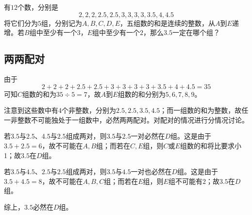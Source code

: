 

有$12$个数，分别是
\[ 2, 2, 2, 2.5, 2.5, 3, 3, 3, 3, 3.5, 4, 4.5 \]
将它们分为$5$组，分别记为$A, B, C, D, E$，五组数的和是连续的整数，从$A$到$E$递增。若$B$组中至少有一个$3$，$E$组中至少有一个$2$，那么$3.5$一定在哪个组？


\subsection{两两配对}

由于
\[ 2 + 2 + 2 + 2.5 + 2.5 + 3 + 3 + 3 + 3 + 3.5 + 4 + 4.5 = 35 \]
可知$C$组数的和为$35 \div 5 = 7$，故$A$到$E$组数的和分别为$5, 6, 7, 8, 9$。

注意到这些数中有4个非整数，分别为$2.5, 2.5, 3.5, 4.5$；而一组数的和为整数，故任一非整数不可能独处于一组数中，必然两两配对。对配对的情况进行分情况讨论。

若$3.5$与$2.5$、$4.5$与$2.5$组成两对，则$3.5$与$2.5$一对必然在$D$组。这是由于$3.5 + 2.5 = 6$，故不可能在$A, B$组；而若在$C, E$组，则$C$或$E$组数的和将比要求小1；故$3.5$在$D$组。

若$3.5$与$4.5$、$2.5$与$2.5$组成两对，则$3.5$与$4.5$一对也必然在$D$组。这是由于$3.5 + 4.5 = 8$，故不可能在$A, B, C$组；而若在$E$组，则$E$组不可能有$2$；故$3.5$在$D$组。

综上，$3.5$必然在$D$组。
